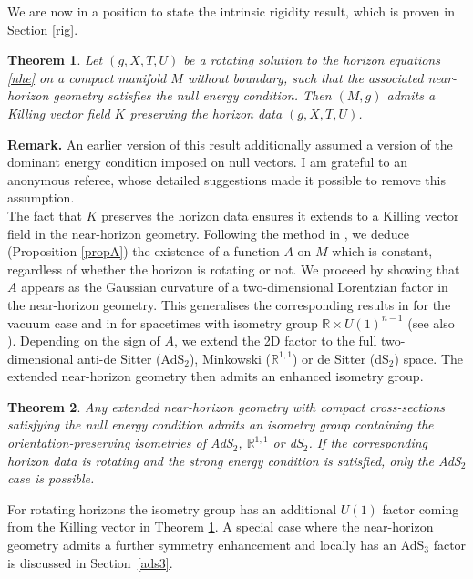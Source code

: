 \documentclass[11pt, reqno]{amsart}
\newcommand{\R}{\mathbb{R}}
\theoremstyle{plain}
\newtheorem{theorem}{Theorem}
\theoremstyle{definition}
\numberwithin{equation}{section}
\begin{document}
We are now in a position to state the intrinsic rigidity result, which is proven in Section \ref{rig}.  

\begin{theorem}\label{thm1}
    Let $(g,X,T,U)$ be a rotating solution to the horizon equations \eqref{nhe} on a compact manifold $M$ without boundary, such that the associated near-horizon geometry satisfies the null energy condition. Then $(M,g)$ admits a Killing vector field $K$ preserving the horizon data $(g,X,T,U)$. 
\end{theorem} 

\noindent \textbf{Remark.} An earlier version of this result additionally assumed a version of the dominant energy condition imposed on null vectors. I am grateful to an anonymous referee, whose detailed suggestions made it possible to remove this assumption. \\

The fact that $K$ preserves the horizon data ensures it extends to a Killing vector field in the near-horizon geometry. Following the method in \cite{KL24, DL}, we deduce (Proposition \ref{propA}) the existence of a function $A$ on $M$ which is constant, regardless of whether the horizon is rotating or not. We proceed by showing that $A$ appears as the Gaussian curvature of a two-dimensional Lorentzian factor in the near-horizon geometry. This generalises the corresponding results in \cite{DL} for the vacuum case and in \cite{KLR} for spacetimes with isometry group $\mathbb{R}\times U(1)^{n-1}$ (see also \cite{L12}). Depending on the sign of $A$, we extend the 2D factor to the full two-dimensional anti-de Sitter (AdS$_2$), Minkowski ($\R^{1,1}$) or de Sitter (dS$_2$) space. The extended near-horizon geometry then admits an enhanced isometry group.
\begin{theorem} \label{thm2}
Any extended near-horizon geometry with compact cross-sections satisfying the null energy condition admits an isometry group containing the orientation-preserving isometries of \textup{AdS}$_2$, $\mathbb{R}^{1,1}$ or \textup{dS}$_2$. If the corresponding horizon data is rotating and the strong energy condition is satisfied, only the \textup{AdS}$_2$ case is possible.
\end{theorem}
For rotating horizons the isometry group has an additional $U(1)$ factor coming from the Killing vector in Theorem \ref{thm1}. A special case where the near-horizon geometry admits a further symmetry enhancement and locally has an AdS$_3$ factor is discussed in Section~\ref{ads3}.
\end{document}
